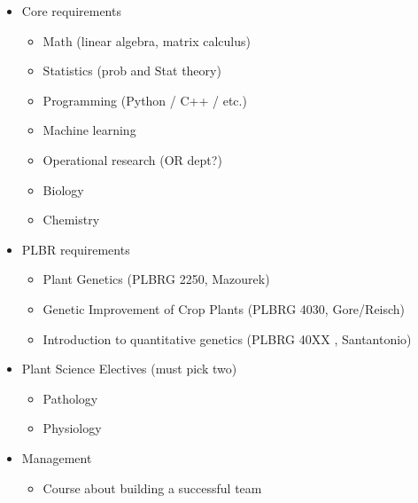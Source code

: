 \documentclass[10pt]{article}
\begin{document}

\begin{itemize}

	\item Core requirements
	\begin{itemize}	
		\item Math (linear algebra, matrix calculus)
		\item Statistics (prob and Stat theory)
		\item Programming (Python / C++ / etc.)
		\item Machine learning
		\item Operational research (OR dept?)
		\item Biology
		\item Chemistry
	\end{itemize} 

	\item PLBR requirements
	\begin{itemize}
		\item Plant Genetics (PLBRG 2250, Mazourek)
		\item Genetic Improvement of Crop Plants (PLBRG 4030, Gore/Reisch)
		\item Introduction to quantitative genetics (PLBRG 40XX , Santantonio)
	\end{itemize} 

	\item Plant Science Electives (must pick two)
	\begin{itemize}
		\item Pathology 
		\item Physiology
	\end{itemize} 

	\item Management
	\begin{itemize}
		\item Course about building a successful team
	\end{itemize} 

\end{itemize}
\end{document}
